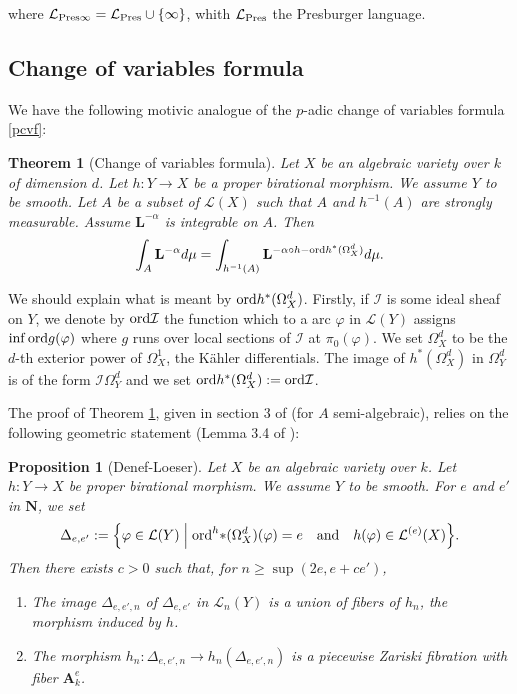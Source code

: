 \documentclass[english,12pt]{amsart}
\def\AA{{\mathbf A}}
\def\LL{{\mathbf L}}
\def\NN{{\mathbf N}}
\def\cI{{\mathcal I}}
\def\cL{{\mathcal L}}
\newtheorem{theorem}[subsubsection]{Theorem}
\newtheorem{prop}[subsubsection]{Proposition}
\theoremstyle{definition}
\theoremstyle{remark}
\theoremstyle{plain}
\numberwithin{equation}{subsection}
\def\AA{{\mathbf A}}
\def\LL{{\mathbf L}}
\def\NN{{\mathbf N}}
\def\cI{{\mathcal I}}
\def\cL{{\mathcal L}}
\def\ord{{\rm ord}}
\begin{document}
where $\cL_{\rm Pres \infty} = \cL_{\rm Pres} \cup \{\infty\}$,
whith $ \cL_{\rm Pres}$
the Presburger language.




\subsection{Change of variables formula}

We have the following motivic analogue of
the $p$-adic change of variables formula \ref{pcvf}:



\begin{theorem}[Change of variables formula]\label{cvf}Let $X$
be an algebraic variety over $k$ of dimension $d$.
Let $h : Y \rightarrow X$ be a proper birational morphism. We assume $Y$
to be smooth. Let $A$ be  a subset 
of $\cL (X)$ such that $A$ and $h^{-1} (A) $ are strongly measurable.
Assume
$\LL^{- \alpha}$ is integrable on $A$.
Then
$$
\int_A \LL^{- \alpha} d \mu
=
\int_{h^{-1} (A)} \LL^{- \alpha \circ h - \ord h^* (\Omega^d_X)} d\mu.
$$
\end{theorem}

We should explain what is meant by  $ \ord h^{*} (\Omega^d_X)$.
Firstly, if $\cI$ is some ideal sheaf on $Y$, we denote by
$\ord \cI$ the function which to a arc $\varphi$ in $\cL (Y)$
assigns $\inf \ord g (\varphi)$ where $g$ runs over local sections of $\cI$ at
$\pi_0 (\varphi)$. We set $\Omega^d_X$ to be the $d$-th exterior power of
$\Omega^1_X$, the K\"ahler differentials. The image of
$h^* (\Omega^d_X)$ in $\Omega^d_Y$ is of the form
$\cI \Omega^d_Y$ and we set $ \ord h^{*} (\Omega^d_X) := \ord \cI$.



The proof of Theorem \ref{cvf}, given in section 3 of 
\cite{inv} (for $A$ semi-algebraic),
relies on the following geometric statement (Lemma 3.4 
of  \cite{inv}):


\begin{prop}[Denef-Loeser]\label{procvf}Let $X$
be an algebraic variety over $k$.
Let $h : Y \rightarrow X$ be proper birational morphism. We assume $Y$
to be smooth.
For $e$ and $e'$ in $\NN$, we set
$$
\Delta_{e, e'} :=
\Bigl \{ \varphi \in \cL (Y) \Bigm \vert
\ord^h{*} (\Omega^d_X) (\varphi) =
e \quad \text{and} \quad h (\varphi) \in \cL^{(e)} (X)\Bigr\}.
$$
Then there exists $c > 0$ such that, for $n \geq \sup (2e, e + ce')$,
\begin{enumerate}
\item[(1)]The image $\Delta_{e, e', n}$ of
$\Delta_{e, e'}$  in $\cL_n (Y)$ is a union of fibers of $h_n$, the morphism induced by $h$.
\item[(2)]The morphism
$h_n : \Delta_{e, e', n} \rightarrow h_n (\Delta_{e, e', n})$
is a piecewise Zariski fibration with fiber $\AA^e_k$.
\end{enumerate}
\end{prop}
\end{document}
